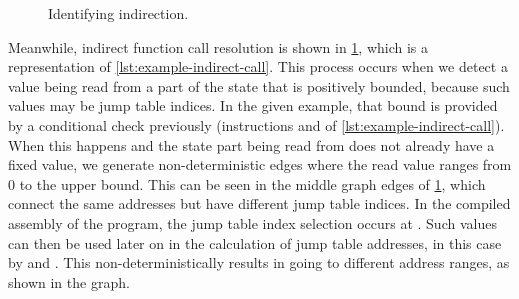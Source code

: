 \begin{figure}
  \centering
  \caption{Identifying indirection.}\label{fig:example-indirect-call}
\end{figure}
Meanwhile, indirect function call resolution is shown in \cref{fig:example-indirect-call}, which is a representation of \cref{lst:example-indirect-call}.
This process occurs when we detect a value being read from a part of the state
that is positively bounded, because such values may be jump table indices.
In the given example, that bound is provided by a conditional check previously (instructions  and  of \cref{lst:example-indirect-call}).
When this happens and the state part being read from does not already have a fixed value, we generate non-deterministic edges where the read value ranges from 0 to the upper bound.
This can be seen in the middle graph edges of \cref{fig:example-indirect-call},
which connect the same addresses but have different jump table indices.
In the compiled assembly of the program, the jump table index selection occurs at .
Such values can then be used later on in the calculation of jump table addresses, in this case by  and .
This non-deterministically results in  going to different address ranges, as shown in the graph.

